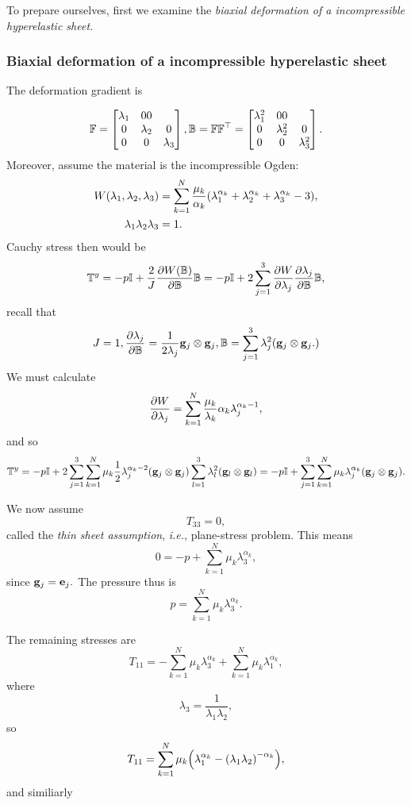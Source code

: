 \documentclass[reqno, a4paper]{article}
\begin{document}
To prepare ourselves, first we examine the \textit{biaxial deformation of a incompressible hyperelastic sheet.}

\subsubsection{Biaxial deformation of a incompressible hyperelastic sheet}
\label{sec:biaxial}
The deformation gradient is

\[
	\mathbb{F} = \begin{bmatrix}
		\lambda_1 & 0 0 \\
		0 & \lambda_2 & 0 \\
		0 & 0 & \lambda_3
	\end{bmatrix},
	\mathbb{B} = \mathbb{F} \mathbb{F}^\top = \begin{bmatrix}
		\lambda_1^{2} & 0 0 \\
		0 & \lambda_2^{2} & 0 \\
		0 & 0 & \lambda_3^{2}
	\end{bmatrix}.
\]
Moreover, assume the material is the incompressible Ogden:
\begin{align*}
	W\qty(\lambda_1, \lambda_2, \lambda_3) &= \sum_{k=1}^N \frac{\mu_k}{\alpha_k}\qty(\lambda_1^{\alpha_k} + \lambda_2^{\alpha_k} + \lambda_3^{\alpha_k}-3), \\
	\lambda_1 \lambda_2 \lambda_3 &= 1.
\end{align*}
Cauchy stress then would be
\[
	\mathbb{T}^y = - p \mathbb{I} + \frac{2}{J} \pdv{W\qty(\ensuremath{\mathbb{B}})}{\ensuremath{\mathbb{B}}}\mathbb{B} = -p \mathbb{I} + 2 \sum_{j=1}^3 \pdv{W}{\lambda_j}\pdv{\lambda_j}{\ensuremath{\mathbb{B}}}\mathbb{B},
\]
recall that
\[
	J = 1, \pdv{\lambda_j}{\ensuremath{\mathbb{B}}} = \frac{1}{2 \lambda_j}\vb{g}_j \otimes \vb{g}_j, \mathbb{B} = \sum_{j = 1}^3 \lambda_j^{2}\qty(\vb{g}_j \otimes \vb{g}_j.)
\]
We must calculate
\[
	\pdv{W}{\lambda_j} = \sum_{k=1}^N \frac{\mu_k}{\lambda_k} \alpha_k \lambda_j^{\alpha_k - 1},
\]
and so 
\[
	\mathbb{T}^y = - p \mathbb{I} + 2 \sum_{j=1}^3 \sum_{k=1}^N \mu_k \frac{1}{2} \lambda_j^{\alpha_k - 2} \qty(\vb{g}_j \otimes \vb{g}_j)\sum_{l=1}^3 \lambda_l^{2}\qty(\vb{g}_l \otimes \vb{g}_l) = - p \mathbb{I} + \sum_{j=1}^3 \sum_{k=1}^N \mu_k \lambda_j^{\alpha_k}\qty(\vb{g}_j \otimes \vb{g}_j).
\]

We now assume
\[
	T_{33} = 0,
\]
called the \textit{thin sheet assumption}, \textit{i.e.}, plane-stress problem. This means
\[
	0 = - p + \sum_{k=1}^N \mu_k \lambda_3^{\alpha_k},
\]
since $\vb{g}_j =  \vb{e}_j.$ The pressure thus is
\[
	p = \sum_{k=1}^N \mu_k \lambda_3^{\alpha_k}.
\]

The remaining stresses are
\[
	T_{11} = - \sum_{k=1}^N \mu_k \lambda_3^{\alpha_k} + \sum_{k=1}^N \mu_k \lambda^{\alpha_k}_1,
\]
where
\[
	\lambda_3 = \frac{1}{\lambda_1 \lambda_2},
\]
so
\[
	T_{11} = \sum_{k=1}^N \mu_k \qty(\lambda_1^{\alpha_k} - \qty(\lambda_1 \lambda_2)^{-\alpha_k}),
\]
and similiarly
\end{document}
